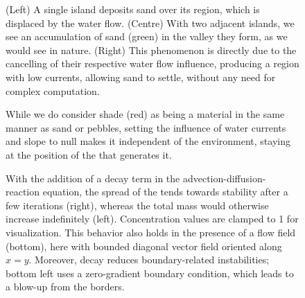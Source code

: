 \begin{figure}
    \caption{(Left) A single island deposits sand over its region, which is displaced by the water flow. (Centre) With two adjacent islands, we see an accumulation of sand (green) in the valley they form, as we would see in nature. (Right) This phenomenon is directly due to the cancelling of their respective water flow influence, producing a region with low currents, allowing sand to settle, without any need for complex computation.}
    \label{fig:env-obj-double-island-sand-deposition}
\end{figure}

\begin{figure}
    \caption{While we do consider shade (red) as being a material in the same manner as sand or pebbles, setting the influence of water currents and slope to null makes it independent of the environment, staying at the position of the  that generates it.}
    \label{fig:env-obj-shade}
\end{figure}

\begin{figure}[H]
    \autofitcaptions[]{}
    \caption{With the addition of a decay term in the advection-diffusion-reaction equation, the spread of the  tends towards stability after a few iterations (right), whereas the total mass would otherwise increase indefinitely (left). Concentration values are clamped to 1 for visualization. This behavior also holds in the presence of a flow field (bottom), here with bounded diagonal vector field oriented along $x=y$. Moreover, decay reduces boundary-related instabilities; bottom left uses a zero-gradient boundary condition, which leads to a blow-up from the borders.}
    \label{fig:env-obj-stability-examples}
\end{figure}

